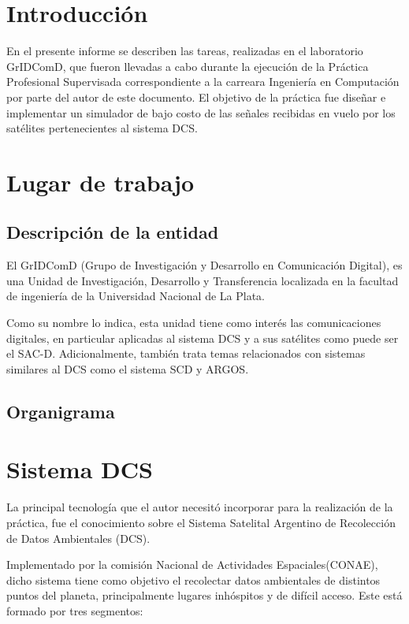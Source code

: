 \documentclass[a4paper,10pt]{article}
\begin{document}
\tableofcontents

\pagebreak
\setcounter{page}{1}
\section{Introducción}
En el presente informe se describen las tareas, realizadas en el laboratorio
GrIDComD, que fueron llevadas a cabo durante la ejecución de la Práctica Profesional
Supervisada correspondiente a la carreara Ingeniería en Computación por parte del autor de
este documento. El objetivo de la práctica fue diseñar e implementar un simulador de bajo costo
de las señales recibidas en vuelo por los satélites pertenecientes al sistema DCS.

\section{Lugar de trabajo}
\subsection{Descripción de la entidad}
El GrIDComD (Grupo de Investigación y Desarrollo en Comunicación Digital),  es una Unidad de Investigación, Desarrollo y Transferencia localizada en la facultad de ingeniería de la Universidad Nacional de La Plata.
\par
Como su nombre lo indica, esta unidad tiene como interés las comunicaciones digitales, en particular aplicadas al sistema DCS y a sus satélites como puede ser el SAC-D. Adicionalmente, también trata temas relacionados con sistemas similares al DCS como el sistema SCD y ARGOS.
\subsection{Organigrama}

\section{Sistema DCS}

La principal tecnología que el autor necesitó incorporar para la realización de la práctica, fue el conocimiento
sobre el Sistema Satelital Argentino de Recolección de Datos Ambientales (DCS). 
\par
Implementado por la comisión Nacional de Actividades Espaciales(CONAE), dicho sistema tiene como objetivo el
recolectar datos ambientales de distintos puntos del planeta, principalmente lugares inhóspitos y de difícil acceso. Este está formado
por tres segmentos:
\end{document}
